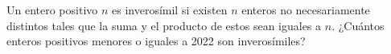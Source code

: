 Un entero positivo $n$ es inverosímil si existen $n$ enteros no necesariamente distintos tales que la suma y el producto de estos sean iguales a $n$. ¿Cuántos enteros positivos menores o iguales a 2022 son inverosímiles?